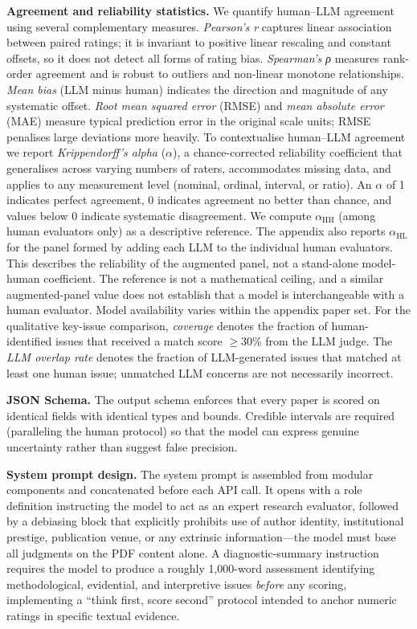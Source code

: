 \documentclass[
  11pt,
  letterpaper,
]{article}
\begin{document}
\textbf{Agreement and reliability statistics.} We quantify human--LLM
agreement using several complementary measures. \emph{Pearson's r}
captures linear association between paired ratings; it is invariant to
positive linear rescaling and constant offsets, so it does not detect
all forms of rating bias. \emph{Spearman's ρ} measures rank-order
agreement and is robust to outliers and non-linear monotone
relationships. \emph{Mean bias} (LLM minus human) indicates the
direction and magnitude of any systematic offset. \emph{Root mean
squared error} (RMSE) and \emph{mean absolute error} (MAE) measure
typical prediction error in the original scale units; RMSE penalises
large deviations more heavily. To contextualise human--LLM agreement we
report \emph{Krippendorff's alpha} (\(\alpha\)), a chance-corrected
reliability coefficient that generalises across varying numbers of
raters, accommodates missing data, and applies to any measurement level
(nominal, ordinal, interval, or ratio). An \(\alpha\) of 1 indicates
perfect agreement, 0 indicates agreement no better than chance, and
values below 0 indicate systematic disagreement. We compute
\(\alpha_{\text{HH}}\) (among human evaluators only) as a descriptive
reference. The appendix also reports \(\alpha_{\text{HL}}\) for the
panel formed by adding each LLM to the individual human evaluators. This
describes the reliability of the augmented panel, not a stand-alone
model-human coefficient. The reference is not a mathematical ceiling,
and a similar augmented-panel value does not establish that a model is
interchangeable with a human evaluator. Model availability varies within
the appendix paper set. For the qualitative key-issue comparison,
\emph{coverage} denotes the fraction of human-identified issues that
received a match score \(\geq 30\%\) from the LLM judge. The \emph{LLM
overlap rate} denotes the fraction of LLM-generated issues that matched
at least one human issue; unmatched LLM concerns are not necessarily
incorrect.

\textbf{JSON Schema.} The output schema enforces that every paper is
scored on identical fields with identical types and bounds. Credible
intervals are required (paralleling the human protocol) so that the
model can express genuine uncertainty rather than suggest false
precision.

\textbf{System prompt design.} The system prompt is assembled from
modular components and concatenated before each API call. It opens with
a role definition instructing the model to act as an expert research
evaluator, followed by a debiasing block that explicitly prohibits use
of author identity, institutional prestige, publication venue, or any
extrinsic information---the model must base all judgments on the PDF
content alone. A diagnostic-summary instruction requires the model to
produce a roughly 1,000-word assessment identifying methodological,
evidential, and interpretive issues \emph{before} any scoring,
implementing a ``think first, score second'' protocol intended to anchor
numeric ratings in specific textual evidence.
\end{document}
